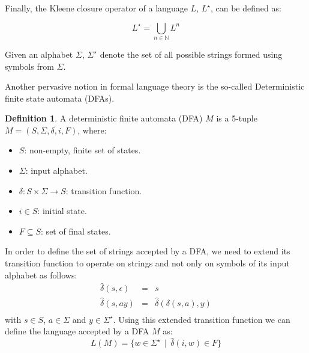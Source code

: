 \documentclass[oneside,12pt]{scrbook}
\theoremstyle{definition}
\theoremstyle{plain}
\theoremstyle{definition}
\newtheorem{Definition}{Definition}
\begin{document}
Finally, the Kleene closure operator of a language $L$, $L^\star$, can be defined as:

\begin{equation*}
L^{\star} = \bigcup_{n\in \mathbb{N}}L^{n}
\end{equation*}

Given an alphabet $\Sigma$, $\Sigma^\star$ denote the set of all possible strings
formed using symbols from $\Sigma$.

Another pervasive notion in formal language theory is the so-called 
Deterministic finite state automata (DFAs).
\begin{Definition}
    A deterministic finite automata (DFA) $M$ is a 5-tuple $M=(S,\Sigma,\delta,i,F)$, where:
    \begin{itemize}
        \item $S$: non-empty, finite set of states.
        \item $\Sigma$: input alphabet.
        \item $\delta : S \times \Sigma \to S$: transition function.
        \item $i \in S$: initial state.
        \item $F \subseteq S$: set of final states.
    \end{itemize}
\end{Definition}

In order to define the set of strings accepted by a DFA, we need to extend its transition function to
operate on strings and not only on symbols of its input alphabet as follows:
\begin{equation*}
  \begin{array}{lcl}
    \widehat{\delta}(s,\epsilon) & = & s \\
    \widehat{\delta}(s,ay)      & = & \widehat{\delta}(\delta(s,a),y)\\
  \end{array}
\end{equation*}
with $s \in S$, $a \in \Sigma$ and $y \in \Sigma^\star$. Using this extended transition function we can
define the language accepted by a DFA $M$ as:
\begin{equation*}
  L(M) = \{w \in \Sigma^\star\,\mid\, \widehat{\delta}(i,w) \in F\}
\end{equation*}
\end{document}
